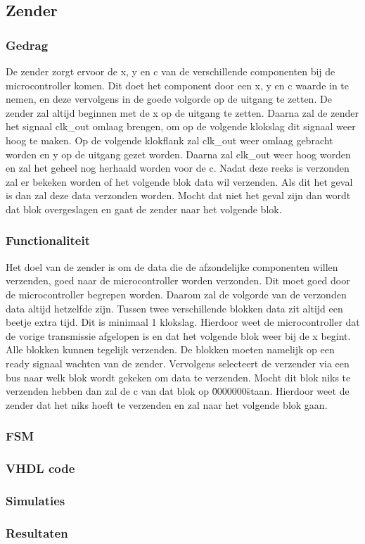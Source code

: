 \subsection{Zender}

\subsubsection{Gedrag}
De zender zorgt ervoor de x, y en c van de verschillende componenten bij de microcontroller komen. Dit doet het component door een x, y en c waarde in te nemen, en deze vervolgens in de goede volgorde op de uitgang te zetten. De zender zal altijd beginnen met de x op de uitgang te zetten. Daarna zal de zender het signaal clk\_out omlaag brengen, om op de volgende klokslag dit signaal weer hoog te maken. Op de volgende klokflank zal clk\_out weer omlaag gebracht worden en y op de uitgang gezet worden. Daarna zal clk\_out weer hoog worden en zal het geheel nog herhaald worden voor de c. Nadat deze reeks is verzonden zal er bekeken worden of het volgende blok data wil verzenden. Als dit het geval is dan zal deze data verzonden worden. Mocht dat niet het geval zijn dan wordt dat blok overgeslagen en gaat de zender naar het volgende blok.

\subsubsection{Functionaliteit}
Het doel van de zender is om de data die de afzondelijke componenten willen verzenden, goed naar de microcontroller worden verzonden. Dit moet goed door de microcontroller begrepen worden. Daarom zal de volgorde van de verzonden data altijd hetzelfde zijn. Tussen twee verschillende blokken data zit altijd een beetje extra tijd. Dit is minimaal 1 klokslag. Hierdoor weet de microcontroller dat de vorige transmissie afgelopen is en dat het volgende blok weer bij de x begint.\\
Alle blokken kunnen tegelijk verzenden. De blokken moeten namelijk op een ready signaal wachten van de zender. Vervolgens selecteert de verzender via een bus naar welk blok wordt gekeken om data te verzenden. Mocht dit blok niks te verzenden hebben dan zal de c van dat blok op \"0000000\" staan. Hierdoor weet de zender dat het niks hoeft te verzenden en zal naar het volgende blok gaan.

\subsubsection{FSM}

\subsubsection{VHDL code}

\subsubsection{Simulaties}

\subsubsection{Resultaten}